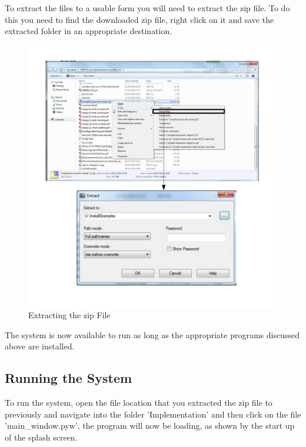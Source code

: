 To extract the files to a usable form you will need to extract the zip file. To do this you need to find the downloaded zip file, right click on it and save the extracted folder in an appropriate destination.

\begin{figure}[H]
    \includegraphics[width=\textwidth]{./Manual/Images/ExtractZIP.pdf}
    \caption{Extracting the zip File} \label{fig:Extracting ZIP}
\end{figure}

The system is now available to run as long as the appropriate programs discussed above are installed.


\subsection{Running the System}

To run the system, open the file location that you extracted the zip file to previously and navigate into the folder 'Implementation' and then click on the file 'main\_window.pyw', the program will now be loading, as shown by the start up of the splash screen.

